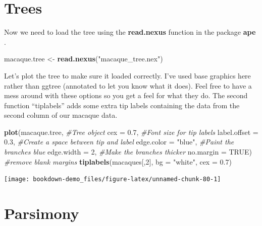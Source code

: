 \documentclass[
]{book}
\newenvironment{Shaded}{\begin{snugshade}}{\end{snugshade}}
\newcommand{\CommentTok}[1]{\textcolor[rgb]{0.56,0.35,0.01}{\textit{#1}}}
\newcommand{\DataTypeTok}[1]{\textcolor[rgb]{0.13,0.29,0.53}{#1}}
\newcommand{\DecValTok}[1]{\textcolor[rgb]{0.00,0.00,0.81}{#1}}
\newcommand{\FloatTok}[1]{\textcolor[rgb]{0.00,0.00,0.81}{#1}}
\newcommand{\KeywordTok}[1]{\textcolor[rgb]{0.13,0.29,0.53}{\textbf{#1}}}
\newcommand{\NormalTok}[1]{#1}
\newcommand{\OtherTok}[1]{\textcolor[rgb]{0.56,0.35,0.01}{#1}}
\newcommand{\StringTok}[1]{\textcolor[rgb]{0.31,0.60,0.02}{#1}}
\begin{document}
\hypertarget{trees}{%
\section{Trees}\label{trees}}

Now we need to load the tree using the \textbf{read.nexus} function in the package \textbf{ape} \citep{ape}.

\begin{Shaded}
\begin{Highlighting}[]
\NormalTok{macaque.tree \textless{}{-}}\StringTok{ }\KeywordTok{read.nexus}\NormalTok{(}\StringTok{"macaque\_tree.nex"}\NormalTok{)}
\end{Highlighting}
\end{Shaded}

Let's plot the tree to make sure it loaded correctly. I've used base graphics here rather than ggtree (annotated to let you know what it does). Feel free to have a mess around with these options so you get a feel for what they do. The second function ``tiplabels'' adds some extra tip labels containing the data from the second column of our macaque data.

\begin{Shaded}
\begin{Highlighting}[]
\KeywordTok{plot}\NormalTok{(macaque.tree,        }\CommentTok{\#Tree object}
     \DataTypeTok{cex =} \FloatTok{0.7}\NormalTok{,           }\CommentTok{\#Font size for tip labels}
     \DataTypeTok{label.offset =} \FloatTok{0.3}\NormalTok{,  }\CommentTok{\#Create a space between tip and label}
     \DataTypeTok{edge.color =} \StringTok{"blue"}\NormalTok{, }\CommentTok{\#Paint the branches blue}
     \DataTypeTok{edge.width =} \DecValTok{2}\NormalTok{,      }\CommentTok{\#Make the branches thicker}
     \DataTypeTok{no.margin =} \OtherTok{TRUE}\NormalTok{)    }\CommentTok{\#remove blank margins  }
\KeywordTok{tiplabels}\NormalTok{(macaques[,}\DecValTok{2}\NormalTok{], }\DataTypeTok{bg =} \StringTok{"white"}\NormalTok{, }\DataTypeTok{cex =} \FloatTok{0.7}\NormalTok{)}
\end{Highlighting}
\end{Shaded}

\begin{center}\texttt{[image: bookdown-demo\_files/figure-latex/unnamed-chunk-80-1]} \end{center}

\hypertarget{parsimony}{%
\section{Parsimony}\label{parsimony}}
\end{document}

